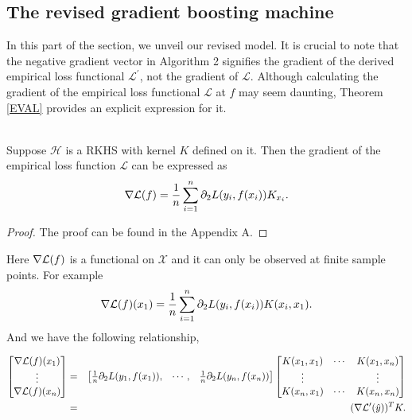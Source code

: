 \subsection{The revised gradient boosting machine}
In this part of the section, we unveil our revised model. It is crucial to note that the negative gradient vector in Algorithm 2 signifies the gradient of the derived empirical loss functional $\mathcal{L}^\prime$, not the gradient of $\mathcal{L}$. Although calculating the gradient of the empirical loss functional $\mathcal{L}$ at $f$ may seem daunting, Theorem \ref{EVAL} provides an explicit expression for it.

\begin{Theorem} \label{thm:gradient-of-LL}\ \\
Suppose $\mathcal{H}$ is a RKHS with kernel $K$ defined on it. Then the gradient of the empirical loss function $\mathcal{L}$ can be expressed as
$$
\nabla \mathcal{L} (f) = \frac{1}{n} \sum_{i=1}^{n} \partial_2 L(y_i,f(x_i)) K_{x_i}. 
$$
\end{Theorem}
\begin{proof}
The proof can be found in the Appendix A.
\end{proof}


Here $\nabla \mathcal{L} (f)$ is a functional on $\mathcal{X}$ and it can only be observed at finite sample points. For example 
$$
\nabla \mathcal{L} (f) (x_1) = \frac{1}{n} \sum_{i=1}^{n} \partial_2 L(y_i,f(x_i)) K(x_i, x_1) .
$$ 
And we have the following relationship,

\begin{eqnarray*}
\begin{bmatrix}
\nabla \mathcal{L}(f)(x_1) \\
\vdots \\
\nabla \mathcal{L}(f)(x_n) 
\end{bmatrix}
& = & \begin{bmatrix}
	 \frac{1}{n} \partial_2 L (y_1, f(x_1)), &
	\cdots, &
	 \frac{1}{n} \partial_2 L (y_n, f(x_n)) 
\end{bmatrix} \begin{bmatrix}
	K(x_1,x_1)  & \cdots & K(x_1,x_n) \\
	\vdots  & & \vdots \\
	K(x_n,x_1)  & \cdots & K(x_n,x_n) \\	
\end{bmatrix}\\
& = &(\nabla \mathcal{L}^\prime (\hat y))^T K.
\end{eqnarray*} \\


